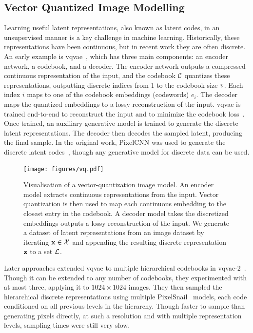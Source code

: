 \subsection{Vector Quantized Image Modelling}
\label{subsec:vqmodelling}

Learning useful latent representations, also known as latent codes, in an
unsupervised manner is a key challenge in machine learning. Historically, these
representations have been continuous, but in recent work they are often
discrete. An early example is \gls{vqvae}~\cite{oord2017vqvae}, which has three
main components: an encoder network, a codebook, and a decoder. The encoder
network outputs a compressed continuous representation of the input, and the
codebook $\mathcal{C}$ quantizes these representations, outputting discrete
indices from $1$ to the codebook size $v$. Each index $i$ maps to
one of the codebook embeddings (codewords) $e_i$. The decoder maps the quantized
embeddings to a lossy reconstruction of the input. \Gls{vqvae} is trained
end-to-end to reconstruct the input and to minimize the codebook
loss~\cite{oord2017vqvae}. Once trained, an auxiliary generative model is
trained to generate the discrete latent representations. The decoder then
decodes the sampled latent, producing the final sample. In the original work,
PixelCNN was used to generate the discrete latent codes~\cite{oord2017vqvae},
though any generative model for discrete data can be used.

\begin{figure}[ht!]
    \centering
    \texttt{[image: figures/vq.pdf]}
    \caption{
        Visualisation of a vector-quantization image model. An encoder model
        extracts continuous representations from the input. Vector
        quantization is then used to map each continuous embedding to the
        closest entry in the codebook. A decoder model takes the discretized
        embeddings outputs a lossy reconstruction of the input. We 
        generate a dataset of latent representations from an image dataset 
        by iterating $\mathbf{x} \in \mathcal{X}$ and appending the resulting
        discrete representation $\mathbf{z}$ to a set $\mathcal{L}$.
    }
    \label{fig:vq}
\end{figure}

Later approaches extended \gls{vqvae} to multiple hierarchical codebooks in
\acrshort{vqvae}-2~\cite{razavi2019generating}. Though it can be extended to any
number of codebooks, they experimented with at most three, applying it to $1024
\times 1024$ images. They then sampled the hierarchical discrete representations
using multiple PixelSnail~\cite{chen2017snail} models, each code conditioned on
all previous levels in the hierarchy. Though faster to sample than generating
pixels directly, at such a resolution and with multiple representation levels,
sampling times were still very slow.

